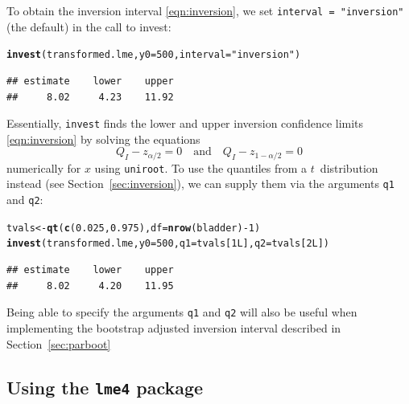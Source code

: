 \documentclass{article}\usepackage[]{graphicx}\usepackage[]{color}
\makeatletter
\newcommand{\hlnum}[1]{\textcolor[rgb]{0.686,0.059,0.569}{#1}}%
\newcommand{\hlstr}[1]{\textcolor[rgb]{0.192,0.494,0.8}{#1}}%
\newcommand{\hlopt}[1]{\textcolor[rgb]{0,0,0}{#1}}%
\newcommand{\hlstd}[1]{\textcolor[rgb]{0.345,0.345,0.345}{#1}}%
\newcommand{\hlkwb}[1]{\textcolor[rgb]{0.69,0.353,0.396}{#1}}%
\newcommand{\hlkwc}[1]{\textcolor[rgb]{0.333,0.667,0.333}{#1}}%
\newcommand{\hlkwd}[1]{\textcolor[rgb]{0.737,0.353,0.396}{\textbf{#1}}}%
\newenvironment{kframe}{%
 \def\at@end@of@kframe{}%
 \ifinner\ifhmode%
  \def\at@end@of@kframe{\end{minipage}}%
  \begin{minipage}{\columnwidth}%
 \fi\fi%
 \def\FrameCommand##1{\hskip\@totalleftmargin \hskip-\fboxsep
 \colorbox{shadecolor}{##1}\hskip-\fboxsep
     \hskip-\linewidth \hskip-\@totalleftmargin \hskip\columnwidth}%
 \MakeFramed {\advance\hsize-\width
   \@totalleftmargin\z@ \linewidth\hsize
   \@setminipage}}%
 {\par\unskip\endMakeFramed%
 \at@end@of@kframe}
\newenvironment{knitrout}{}{} %
\makeatother
\begin{document}
To obtain the inversion interval \eqref{eqn:inversion}, we set \texttt{interval = "inversion"} (the default) in the call to invest:
\begin{knitrout}
\color{fgcolor}\begin{kframe}
\begin{alltt}
\hlkwd{invest}\hlstd{(transformed.lme,} \hlkwc{y0} \hlstd{=} \hlnum{500}\hlstd{,} \hlkwc{interval} \hlstd{=} \hlstr{"inversion"}\hlstd{)}
\end{alltt}
\begin{verbatim}
## estimate    lower    upper 
##     8.02     4.23    11.92
\end{verbatim}
\end{kframe}
\end{knitrout}
Essentially, \texttt{invest} finds the lower and upper inversion confidence limits \eqref{eqn:inversion} by solving the equations
\begin{equation*}
  Q_I - z_{\alpha/2} = 0 \quad \text{and} \quad Q_I - z_{1-\alpha/2} = 0
\end{equation*}
numerically for $x$ using \texttt{uniroot}. To use the quantiles from a $t$~distribution instead (see Section~\ref{sec:inversion}), we can supply them via the arguments \texttt{q1} and \texttt{q2}:
\begin{knitrout}
\color{fgcolor}\begin{kframe}
\begin{alltt}
\hlstd{tvals} \hlkwb{<-} \hlkwd{qt}\hlstd{(}\hlkwd{c}\hlstd{(}\hlnum{0.025}\hlstd{,} \hlnum{0.975}\hlstd{),} \hlkwc{df} \hlstd{=} \hlkwd{nrow}\hlstd{(bladder)} \hlopt{-} \hlnum{1}\hlstd{)}
\hlkwd{invest}\hlstd{(transformed.lme,} \hlkwc{y0} \hlstd{=} \hlnum{500}\hlstd{,} \hlkwc{q1} \hlstd{= tvals[}\hlnum{1L}\hlstd{],} \hlkwc{q2} \hlstd{= tvals[}\hlnum{2L}\hlstd{])}
\end{alltt}
\begin{verbatim}
## estimate    lower    upper 
##     8.02     4.20    11.95
\end{verbatim}
\end{kframe}
\end{knitrout}
Being able to specify the arguments \texttt{q1} and \texttt{q2} will also be useful when implementing the bootstrap adjusted inversion interval described in Section~\ref{sec:parboot}


\subsection[Using the lme4 package]{Using the \texttt{lme4} package}
\label{sec:lme4}
\end{document}
